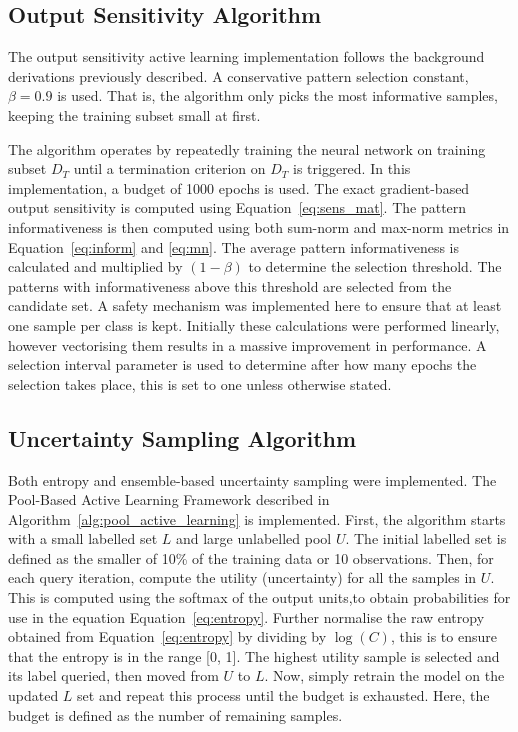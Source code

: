 \documentclass[10pt, conference]{IEEEtran}
\begin{document}
\subsection{Output Sensitivity Algorithm}
The output sensitivity active learning implementation follows the background derivations previously described. A conservative pattern selection constant, $\beta = 0.9$ is used. That is, the algorithm only picks the most informative samples, keeping the training subset small at first. 

The algorithm operates by repeatedly training the neural network on training subset $D_T$ until a termination criterion on $D_T$ is triggered. In this implementation, a budget of 1000 epochs is used. The exact gradient-based output sensitivity is computed using Equation~\ref{eq:sens_mat}. The pattern informativeness is then computed using both sum-norm and max-norm metrics in Equation~\ref{eq:inform} and \ref{eq:mn}. The average pattern informativeness is calculated and multiplied by $(1 - \beta)$ to determine the selection threshold. The patterns with informativeness above this threshold are selected from the candidate set. A safety mechanism was implemented here to ensure that at least one sample per class is kept. Initially these calculations were performed linearly, however vectorising them results in a massive improvement in performance. A selection interval parameter is used to determine after how many epochs the selection takes place, this is set to one unless otherwise stated.

\subsection{Uncertainty Sampling Algorithm}
Both entropy and ensemble-based uncertainty sampling were implemented. The Pool-Based Active Learning Framework described in Algorithm~\ref{alg:pool_active_learning} is implemented. First, the algorithm starts with a small labelled set $L$ and large unlabelled pool $U$. The initial labelled set is defined as the smaller of 10\% of the training data or 10 observations. Then, for each query iteration, compute the utility (uncertainty) for all the samples in $U$. This is computed using the softmax of the output units,to obtain probabilities for use in the equation Equation~\ref{eq:entropy}. Further normalise the raw entropy obtained from Equation~\ref{eq:entropy} by dividing by $\log(C)$, this is to ensure that the entropy is in the range [0, 1]. The highest utility sample is selected and its label queried, then moved from $U$ to $L$. Now, simply retrain the model on the updated $L$ set and repeat this process until the budget is exhausted. Here, the budget is defined as the number of remaining samples.
\end{document}

